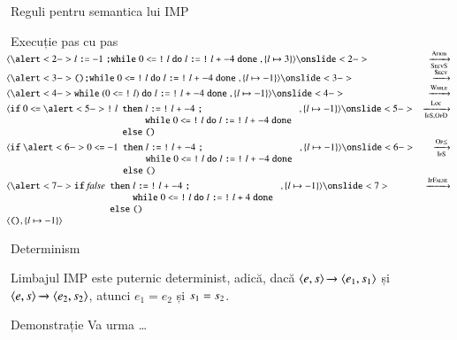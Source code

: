 \documentclass[xcolor=pdftex,romanian,colorlinks]{beamer}
\begin{document}
\begin{section}{Reguli pentru semantica lui IMP}
\begin{frame}{Execuție pas cu pas}{}
$\hspace{-1em}\begin{array}{lr}
\c{\alert<2->{ l \terminal{:=} -1} \terminal{;}  \Swhile 0 \terminal{<=}  {\terminal{!} l} \Sdo  l \terminal{:=}  {\terminal{!} l}  \terminal{+} -4   \Sdone{},\{l \mapsto 3\}}
\onslide<2->
&\xrightarrow[\textsc{SecvS}]{\textsc{Atrib}}\\
\c{\alert<3->{\Sskip \terminal{;} \Swhile 0 \terminal{<=}  {\terminal{!} l} \Sdo l \terminal{:=}  {\terminal{!} l}  \terminal{+} -4  \Sdone{}} ,\{ l \mapsto -1\}}
\onslide<3->
&\xrightarrow{\textsc{Secv}}\\
\c{\alert<4->{\Swhile (0 \terminal{<=}  {\terminal{!} l} )\Sdo l \terminal{:=}  {\terminal{!} l}  \terminal{+} -4   \Sdone{} },\{l \mapsto -1\}}
\onslide<4->
&\xrightarrow{\textsc{While}}\\
\c{\Sif 0 \terminal{<=} \alert<5->{\terminal{!} l}\begin{array}[t]{l@{\;}l} \Sthen& l \terminal{:=} {\terminal{!} l} \terminal{+} -4 \terminal{;} \\& \Swhile 0 \terminal{<=} {\terminal{!} l}\Sdo l \terminal{:=} {\terminal{!} l} \terminal{+} -4    \Sdone{} \\ \Selse &  \Sskip\end{array},\{l \mapsto -1\}}
\onslide<5->
&\xrightarrow[\textsc{IfS,OpD}]{\textsc{Loc}}\\
\c{\Sif \alert<6->{0 \terminal{<=} -1}\begin{array}[t]{l@{\;}l} \Sthen& l \terminal{:=} {\terminal{!} l} \terminal{+}  -4 \terminal{;} \\& \Swhile 0 \terminal{<=}  {\terminal{!} l}\Sdo l \terminal{:=} {\terminal{!} l} \terminal{+} -4   \Sdone{}\\ \Selse &\Sskip\end{array},\{l \mapsto -1\}}
\onslide<6->
&\xrightarrow[\textsc{IfS}]{\textsc{Op$\leq$}}\\
\c{\alert<7->{\Sif  {\Sfalse} \begin{array}[t]{l@{\;}l} \Sthen&  l \terminal{:=} {\terminal{!}l} \terminal{+} -4 \terminal{;} \\ & \Swhile 0 \terminal{<=} {\terminal{!} l}\Sdo l \terminal{:=}  {\terminal{!} l} \terminal{+} 4   \Sdone{}\\ \Selse & \Sskip\end{array}},\{l \mapsto -1\}}
\onslide<7>
&\xrightarrow{\textsc{IfFalse}}\\
\c{\Sskip,\{l \mapsto -1\}}
\end{array}$
\end{frame}


\begin{frame}{Determinism}
\begin{theorem}
Limbajul IMP este puternic determinist, adică,  dacă $\displaystyle{\ensuremath {{\langle{e,s}\rangle}} \xrightarrow{} {{\ensuremath \langle{e_1,s_1}\rangle}}}$ și $\displaystyle{\ensuremath {{\langle{e,s}\rangle}} \xrightarrow{} {{\ensuremath \langle{e_2,s_2}\rangle}}}$, atunci $e_1 = e_2$ și $s_1 = s_2$.
\end{theorem}
\begin{block}{Demonstrație}
 Va urma \ldots
\end{block}
\end{frame}
\end{section}
\end{document}
